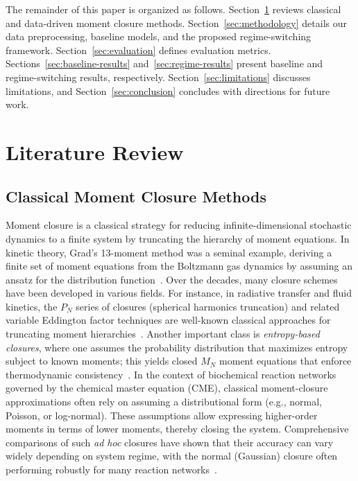 \documentclass[journal, onecolumn]{IEEEtran}
\begin{document}
The remainder of this paper is organized as follows. Section~\ref{sec:litreview} reviews classical and data-driven moment closure methods. Section~\ref{sec:methodology} details our data preprocessing, baseline models, and the proposed regime-switching framework. Section~\ref{sec:evaluation} defines evaluation metrics. Sections~\ref{sec:baseline-results} and~\ref{sec:regime-results} present baseline and regime-switching results, respectively. Section~\ref{sec:limitations} discusses limitations, and Section~\ref{sec:conclusion} concludes with directions for future work.

\section{Literature Review}
\label{sec:litreview}

\subsection{Classical Moment Closure Methods}

Moment closure is a classical strategy for reducing infinite-dimensional stochastic dynamics to a finite system by truncating the hierarchy of moment equations. In kinetic theory, Grad’s 13-moment method was a seminal example, deriving a finite set of moment equations from the Boltzmann gas dynamics by assuming an ansatz for the distribution function~\cite{grad1949kinetic}. Over the decades, many closure schemes have been developed in various fields. For instance, in radiative transfer and fluid kinetics, the $P_N$ series of closures (spherical harmonics truncation) and related variable Eddington factor techniques are well-known classical approaches for truncating moment hierarchies~\cite{levermore1996moment}. Another important class is \textit{entropy-based closures}, where one assumes the probability distribution that maximizes entropy subject to known moments; this yields closed $M_N$ moment equations that enforce thermodynamic consistency~\cite{levermore1996moment}. In the context of biochemical reaction networks governed by the chemical master equation (CME), classical moment-closure approximations often rely on assuming a distributional form (e.g., normal, Poisson, or log-normal). These assumptions allow expressing higher-order moments in terms of lower moments, thereby closing the system. Comprehensive comparisons of such \textit{ad hoc} closures have shown that their accuracy can vary widely depending on system regime, with the normal (Gaussian) closure often performing robustly for many reaction networks~\cite{schnoerr2015comparison}.
\end{document}
